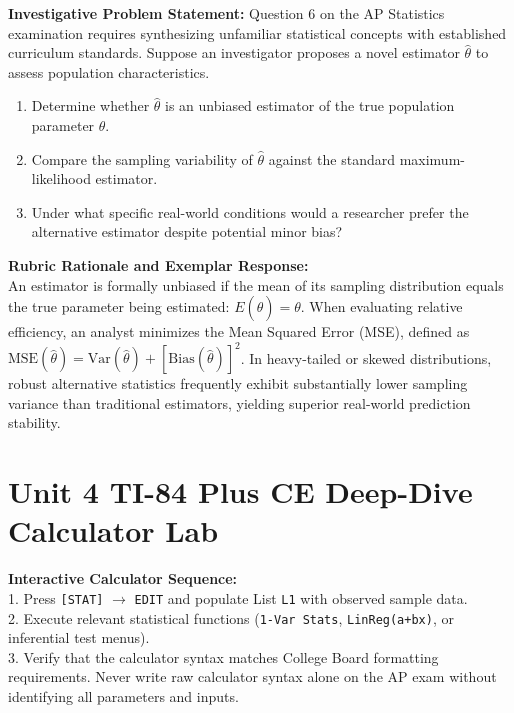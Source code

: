 \begin{frqrubricbox}
\textbf{Investigative Problem Statement:} Question 6 on the AP Statistics examination requires synthesizing unfamiliar statistical concepts with established curriculum standards. Suppose an investigator proposes a novel estimator $\hat{\theta}$ to assess population characteristics.
\begin{enumerate}[label=(\alph*)]
  \item Determine whether $\hat{\theta}$ is an unbiased estimator of the true population parameter $\theta$.
  \item Compare the sampling variability of $\hat{\theta}$ against the standard maximum-likelihood estimator.
  \item Under what specific real-world conditions would a researcher prefer the alternative estimator despite potential minor bias?
\end{enumerate}
\textbf{Rubric Rationale and Exemplar Response:}\\
An estimator is formally unbiased if the mean of its sampling distribution equals the true parameter being estimated: $E(\hat{\theta}) = \theta$. When evaluating relative efficiency, an analyst minimizes the Mean Squared Error (MSE), defined as $\text{MSE}(\hat{\theta}) = \text{Var}(\hat{\theta}) + [\text{Bias}(\hat{\theta})]^2$. In heavy-tailed or skewed distributions, robust alternative statistics frequently exhibit substantially lower sampling variance than traditional estimators, yielding superior real-world prediction stability.
\end{frqrubricbox}\vspace{6pt}
\section{Unit 4 TI-84 Plus CE Deep-Dive Calculator Lab}
\begin{calculatorbox}
\textbf{Interactive Calculator Sequence:}\\
1. Press \texttt{[STAT]} $\rightarrow$ \texttt{EDIT} and populate List \texttt{L1} with observed sample data.\\
2. Execute relevant statistical functions (\texttt{1-Var Stats}, \texttt{LinReg(a+bx)}, or inferential test menus).\\
3. Verify that the calculator syntax matches College Board formatting requirements. Never write raw calculator syntax alone on the AP exam without identifying all parameters and inputs.
\end{calculatorbox}\vspace{10pt}

